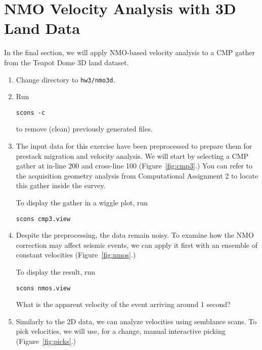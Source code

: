 \lstset{language=python,numbers=left,numberstyle=\tiny,showstringspaces=false}


\section{NMO Velocity Analysis with 3D Land Data}

In the final section, we will apply NMO-based velocity analysis to a CMP gather from the Teapot Dome 3D land dataset.

\begin{enumerate}

\item Change directory to \texttt{hw3/nmo3d}.
\item Run
\begin{verbatim}
scons -c
\end{verbatim}
to remove (clean) previously generated files.
\item The input data for this exercise have been preprocessed to prepare them for prestack migration and velocity analysis. We will start by selecting a CMP gather at in-line 200 and cross-line 100 (Figure~\ref{fig:cmp3}.) You can refer to the acquisition geometry analysis from Computational Assignment 2 to locate this gather inside the survey.


To display the gather in a wiggle plot, run
\begin{verbatim}
scons cmp3.view
\end{verbatim}

\item Despite the preprocessing, the data remain noisy. To examine how the NMO correction may affect seismic events, we can apply it first with an ensemble of constant velocities (Figure~\ref{fig:nmos}.)

To display the result, run
\begin{verbatim}
scons nmos.view
\end{verbatim}

What is the apparent velocity of the event arriving around 1 second?

\answer{
}


\item Similarly to the 2D data, we can analyze velocities using semblance scans. To pick velocities, we will use, for a change, manual interactive picking (Figure~\ref{fig:picks}.)


\end{enumerate}
